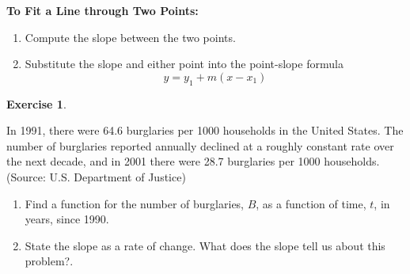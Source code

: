 \documentclass[10pt,]{book}
\theoremstyle{plain}
\theoremstyle{definition}
\theoremstyle{definition}
\theoremstyle{definition}
\theoremstyle{definition}
\newtheorem{exercise}[theorem]{Exercise}
\numberwithin{equation}{section}
\begin{document}
\begin{mdframed}[style=assemblage]%
\noindent\textbf{\large To Fit a Line through Two Points:}\label{assemblage-17}\par\medskip

    \leavevmode%
\begin{enumerate}[label=*\arabic**]
\item\hypertarget{li-185}{}Compute the slope between the two points.%
\item\hypertarget{li-186}{}
                Substitute the slope and either point into the point-slope formula
                \begin{equation*}y = y_1 + m(x − x_1)\end{equation*}
\end{enumerate}

%
\end{mdframed}
\begin{exercise}\label{exercise-burglaries}

In 1991, there were 64.6 burglaries per 1000 households in the United States. The number of burglaries reported annually declined at a roughly constant rate over the next decade, and in 2001 there were 28.7 burglaries per 1000 households. (Source: U.S. Department of Justice)
\leavevmode%
\begin{enumerate}[label=*\alph**]
\item\hypertarget{li-187}{}Find a function for the number of burglaries, \(B\), as a function of time, \(t\), in years, since 1990.
    \item\hypertarget{li-188}{}State the slope as a rate of change. What does the slope tell us about this problem?.
    \end{enumerate}
\end{exercise}
\typeout{************************************************}
\typeout{************************************************}
\end{document}
